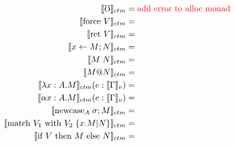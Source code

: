 \documentclass{article}
\makeatletter
\newcommand{\den}[1]{\llbracket #1 \rrbracket}
\newcommand{\red}[1]{\textcolor{red}{#1}}
\newcommand{\err}{\mho}
\newcommand{\force}[1]{\textrm{force }#1}
\newcommand{\ret}[1]{\textrm{ret }#1}
\newcommand{\bind}[3]{#1 \leftarrow #2 ; #3}
\newcommand{\newcase}[3]{\textrm{newcase}_{#1} \; #2 ; #3}
\newcommand{\match}[5]{\textrm{match }#1 \textrm{ with }#2 \;\{#3 . #4 | #5\}}
\newcommand{\ite}[3]{\textrm{if }#1 \textrm{ then }#2 \textrm{ else }#3}
\newcommand{\at}{\textrm{@}}
\makeatother
\begin{document}
\begin{align*}
    \llbracket \err \rrbracket_{ctm} &= \red{\textrm{add error to alloc monad}}\\
    \llbracket \force{V} \rrbracket_{ctm} &= \\
    \llbracket \ret{V} \rrbracket_{ctm} &= \\
    \llbracket \bind{x}{M}{N} \rrbracket_{ctm} &= \\
    \llbracket M \; N \rrbracket_{ctm} &= \\
    \llbracket M \at N \rrbracket_{ctm} &= \\
    \llbracket \lambda x : A . M \rrbracket_{ctm}(e : \den{\Gamma}_{v}) &=  \\
    \llbracket \alpha x : A . M \rrbracket_{ctm}(e : \den{\Gamma}_{v}) &= \\
    \llbracket \newcase{A}{\sigma}{M} \rrbracket_{ctm} &= \\
    \llbracket \match{V_1}{V_2}{x}{M}{N}\rrbracket_{ctm} &= \\
    \llbracket \ite{V}{M}{N} \rrbracket_{ctm} &= \\
\end{align*}




\end{document}
